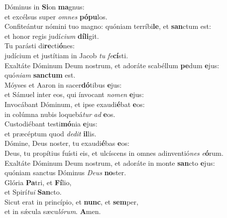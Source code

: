\evenverse Dóminus in \textbf{Si}on \textbf{ma}gnus:~\*\\
\evenverse et excélsus super \textit{om}\textit{nes} \textbf{pó}\textbf{pu}los.\\
\oddverse Confiteántur nómini tuo magno: quóniam terríbi\textbf{le}, et \textbf{san}ctum est:~\*\\
\oddverse et honor regis judí\textit{ci}\textit{um} \textbf{dí}\textbf{li}git.\\
\evenverse Tu parásti di\textbf{re}cti\textbf{ó}nes:~\*\\
\evenverse judícium et justítiam in Jacob \textit{tu} \textit{fe}\textbf{cí}sti.\\
\oddverse Exaltáte Dóminum Deum nostrum, et adoráte scabéllum \textbf{pe}dum \textbf{e}jus:~\*\\
\oddverse quó\textit{ni}\textit{am} \textbf{san}\textbf{ctum} est.\\
\evenverse Móyses et Aaron in sacer\textbf{dó}tibus \textbf{e}jus:~\*\\
\evenverse et Sámuel inter eos, qui ínvocant \textit{no}\textit{men} \textbf{e}jus:\\
\oddverse Invocábant Dóminum, et ipse exaudi\textbf{é}bat \textbf{e}os:~\*\\
\oddverse in colúmna nubis loquebá\textit{tur} \textit{ad} \textbf{e}os.\\
\evenverse Custodiébant testi\textbf{mó}nia \textbf{e}jus:~\*\\
\evenverse et præcéptum quod \textit{de}\textit{dit} \textbf{il}lis.\\
\oddverse Dómine, Deus noster, tu exaudi\textbf{é}bas \textbf{e}os:~\*\\
\oddverse Deus, tu propítius fuísti eis, et ulcíscens in omnes adinventió\textit{nes} \textit{e}\textbf{ó}rum.\\
\evenverse Exaltáte Dóminum Deum nostrum, et adoráte in monte \textbf{san}cto \textbf{e}jus:~\*\\
\evenverse quóniam sanctus Dóminus \textit{De}\textit{us} \textbf{no}ster.\\
\oddverse Glória \textbf{Pa}tri, et \textbf{Fí}lio,~\*\\
\oddverse et Spirí\textit{tu}\textit{i} \textbf{San}cto.\\
\evenverse Sicut erat in princípio, et \textbf{nunc}, et \textbf{sem}per,~\*\\
\evenverse et in sǽcula sæcu\textit{ló}\textit{rum}. \textbf{A}men.\\
